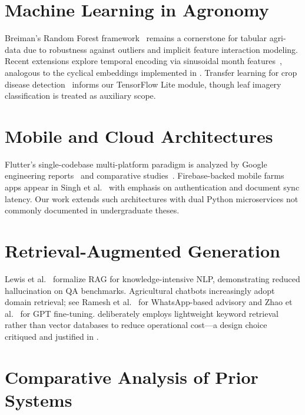 \section{Machine Learning in Agronomy}
\label{sec:lit_ml}

Breiman's Random Forest framework~\cite{breiman2001rf} remains a cornerstone for tabular agri-data due to robustness against outliers and implicit feature interaction modeling. Recent extensions explore temporal encoding via sinusoidal month features~\cite{chen2024seasonal_ml}, analogous to the cyclical embeddings implemented in \HydroSmart{}. Transfer learning for crop disease detection~\cite{mohanty2016plantvillage} informs our TensorFlow Lite module, though leaf imagery classification is treated as auxiliary scope.

\section{Mobile and Cloud Architectures}
\label{sec:lit_mobile}

Flutter's single-codebase multi-platform paradigm is analyzed by Google engineering reports~\cite{flutter2024docs} and comparative studies~\cite{williams2022flutter_perf}. Firebase-backed mobile farms apps appear in Singh et al.~\cite{singh2023firebase_agri} with emphasis on authentication and document sync latency. Our work extends such architectures with dual Python microservices not commonly documented in undergraduate theses.

\section{Retrieval-Augmented Generation}
\label{sec:lit_rag}

Lewis et al.~\cite{lewis2020rag} formalize RAG for knowledge-intensive NLP, demonstrating reduced hallucination on QA benchmarks. Agricultural chatbots increasingly adopt domain retrieval; see Ramesh et al.~\cite{ramesh2024agri_chatbot} for WhatsApp-based advisory and Zhao et al.~\cite{zhao2023agri_gpt} for GPT fine-tuning. \HydroSmart{} deliberately employs lightweight keyword retrieval rather than vector databases to reduce operational cost---a design choice critiqued and justified in .

\section{Comparative Analysis of Prior Systems}
\label{sec:lit_comparison}

